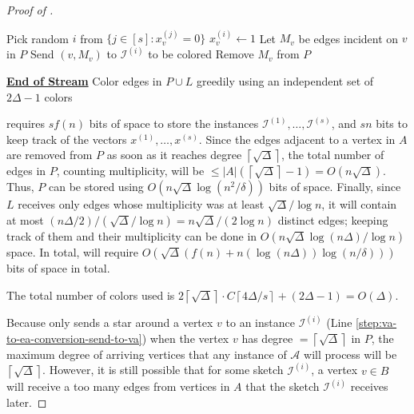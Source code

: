 \documentclass[10pt]{article}
\theoremstyle{definition}\newtheorem{definition}[lemma]{Definition}
\theoremstyle{remark}  \newtheorem*{remark}{Remark}
\newcommand{\cA}{\mathcal{A}}
\newcommand{\cI}{\mathcal{I}}
\newcommand{\ceil}[1]{{\left\lceil{#1}\right\rceil}}
\begin{document}
\begin{proof}[Proof of ]
\begin{algorithm}[htb!]
\begin{algorithmic}[1]
      \If{$\exists v \in A$ with degree $\ge \ceil{\sqrt{\Delta}}$ in $P$}
          \State Pick random $i$ from $\{ j \in [s]: x^{(j)}_v = 0\}$\label{step:va-to-ea-conversion-pick-star}
          \State $x^{(i)}_v \gets 1$
          \State Let $M_v$ be edges incident on $v$ in $P$
          \State Send $(v,M_v)$ to $\cI^{(i)}$ to be colored\label{step:va-to-ea-conversion-send-to-va}
          \State Remove $M_v$ from $P$
      \EndIf
      
    \Statex \underline{\textbf{End of Stream}}
      \State Color edges in $P \cup L$ greedily using an independent set of $2\Delta - 1$ colors
    \end{algorithmic}
  \end{algorithm}
  
   requires $s f(n)$ bits of space to store the instances $\cI^{(1)},\ldots,\cI^{(s)}$, and $s n$ bits to keep track of the vectors $x^{(1)},\ldots,x^{(s)}$. Since the edges adjacent to a vertex in $A$ are removed from $P$ as soon as it reaches degree $\ceil{\sqrt{\Delta}}$, the total number of edges in $P$, counting multiplicity, will be $\le |A| (\ceil{\sqrt{\Delta}} - 1) = O(n\sqrt{\Delta})$. Thus, $P$ can be stored using $O(n \sqrt{\Delta} \log(n^2 / \delta))$ bits of space. Finally, since $L$ receives only edges whose multiplicity was at least $\sqrt{\Delta} / \log n$, it will contain at most $(n \Delta / 2) / (\sqrt{\Delta} / \log n) = n \sqrt{\Delta} / (2 \log n)$ distinct edges; keeping track of them and their multiplicity can be done in $O(n \sqrt{\Delta} \log (n \Delta) / \log n)$ space. In total,   will require $O(\sqrt{\Delta} (f(n) + n (\log (n \Delta)) \log(n/\delta)))$ bits of space in total.
  
  The total number of colors used is $2 \ceil{\sqrt{\Delta}} \cdot C \ceil{4 \Delta / s} + (2 \Delta - 1) = O(\Delta)$.
  
  Because  only sends a star around a vertex $v$ to an instance $\cI^{(i)}$ (Line \ref{step:va-to-ea-conversion-send-to-va}) when the vertex $v$ has degree $= \ceil{\sqrt{\Delta}}$ in $P$, the maximum degree of arriving vertices that any instance of $\cA$ will process will be $\ceil{\sqrt{\Delta}}$. However, it is still possible that for some sketch $\cI^{(i)}$, a vertex $v \in B$ will receive a too many edges from vertices in $A$ that the sketch $\cI^{(i)}$ receives later.
    

\end{proof}
\end{document}

